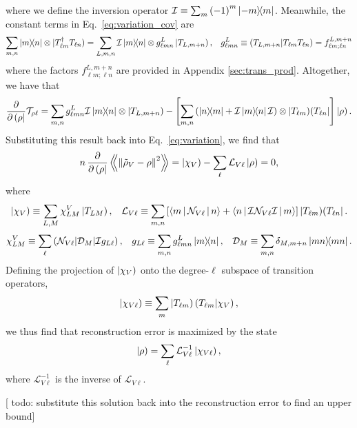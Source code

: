 \documentclass[notitlepage,twocolumn]{revtex4-2}
\newcommand{\f}[2]{\dfrac{#1}{#2}} %
\newcommand{\p}[1]{\left(#1\right)} %
\renewcommand{\sp}[1]{\left[#1\right]} %
\newcommand{\bk}{\Braket} %
\newcommand{\Bbk}[1]
{\left\langle\!\!\left\langle #1 \right\rangle\!\!\right\rangle}
\newcommand{\D}{\mathcal{D}}
\newcommand{\I}{\mathcal{I}}
\renewcommand{\L}{\mathcal{L}}
\newcommand{\N}{\mathcal{N}}
\newcommand{\T}{\mathcal{T}}
\def\obra#1{\mathinner{({#1}|}}
\def\oket#1{\mathinner{|{#1})}}
\def\obk#1{\mathinner{({#1})}}
\def\oop#1#2{\oket{#1}\!\obra{#2}}
\newcommand{\red}[1]{{\color{red} #1}}
\begin{document}
where we define the inversion operator $\I\equiv\sum_m \p{-1}^m\op{-m}{m}$.
Meanwhile, the constant terms in Eq.~\eqref{eq:variation_cov} are
\begin{align}
  \sum_{m,n} \op{m}{n} \otimes \oket{T_{\ell m}^\dag T_{\ell n}}
  = \sum_{L,m,n} \I \op{m}{n} \otimes g_{\ell mn}^L \oket{T_{L,m+n}},
  &&
  g_{\ell mn}^L \equiv \obk{T_{L,m+n}|T_{\ell m} T_{\ell n}}
  = f_{\ell m;\ell n}^{L,m+n}
\end{align}
where the factors $f_{\ell m;\ell n}^{L,m+n}$ are provided in Appendix \ref{sec:trans_prod}.
Altogether, we have that
\begin{align}
  \f{\partial}{\partial\obra\rho} \T_{\rho\ell}
  = \sum_{m,n} g_{\ell mn}^L \I\op{m}{n} \otimes \oket{T_{L,m+n}}
  - \sp{\sum_{m,n} \p{\op{n}{m} + \I\op{m}{n}\I}
    \otimes \oop{T_{\ell m}}{T_{\ell n}}} \oket{\rho}.
\end{align}
Substituting this result back into Eq.~\eqref{eq:variation}, we find that
\begin{align}
  n\, \f{\partial}{\partial\obra\rho}
  \Bbk{\norm{\tilde\rho_V-\rho}^2}
  = \oket{\chi_V} - \sum_\ell \L_{V\ell} \oket\rho
  = 0,
\end{align}
where
\begin{align}
  \oket{\chi_V} \equiv \sum_{L,M} \chi^V_{LM} \oket{T_{LM}},
  &&
  \L_{V\ell} \equiv \sum_{m,n}
  \sp{\bk{m|\N_{V\ell}|n} + \bk{n|\I\N_{V\ell}\I|m}}
  \oop{T_{\ell m}}{T_{\ell n}}.
\end{align}
\begin{align}
  \chi^V_{LM} \equiv \sum_\ell \obk{\N_{V\ell}|\D_M|\I g_{L\ell}},
  &&
  g_{L\ell} \equiv \sum_{m,n} g^L_{\ell mn} \op{m}{n},
  &&
  \D_M \equiv \sum_{m,n} \delta_{M,m+n} \op{mn}{mn}.
\end{align}
Defining the projection of $\oket{\chi_V}$ onto the degree-$\ell$ subspace of transition operators,
\begin{align}
  \oket{\chi_{V\ell}}
  \equiv \sum_m \oket{T_{\ell m}} \obk{T_{\ell m}|\chi_V},
\end{align}
we thus find that reconstruction error is maximized by the state
\begin{align}
  \oket\rho = \sum_\ell \L_{V\ell}^{-1} \oket{\chi_{V\ell}},
\end{align}
where $\L_{V\ell}^{-1}$ is the inverse of $\L_{V\ell}$.

[\red{todo: substitute this solution back into the reconstruction error to find an upper bound}]

\end{document}
